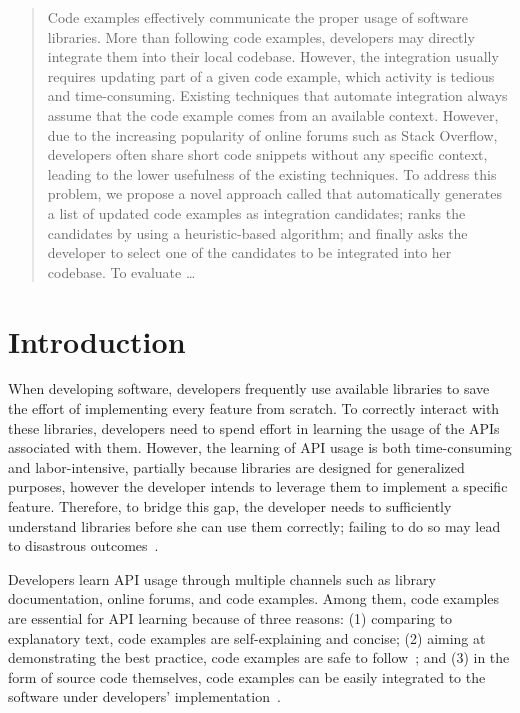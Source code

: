 
\begin{abstract}
Code examples effectively communicate the proper usage of software libraries.
More than following code examples, developers may directly integrate them into
their local codebase. However, the integration usually requires updating part of
a given code example, which activity is tedious and time-consuming.
Existing techniques that automate integration always assume that the code
example comes from an available context. However, due to the increasing
popularity of online forums such as Stack Overflow, developers often share short
code snippets without any specific context, leading to the lower usefulness of
the existing techniques. To address this problem, we propose a novel approach
called \toolname{} that automatically generates a list of updated code examples
as integration candidates; ranks the candidates by using a heuristic-based
algorithm; and finally asks the developer to select one of the candidates to be
integrated into her codebase. To evaluate \toolname{}\ldots
\end{abstract}

\section{Introduction}
When developing software, developers frequently use available libraries to save
the effort of implementing every feature from scratch. To correctly interact
with these libraries, developers need to spend effort in learning the usage of
the APIs associated with them. However, the learning of API usage is both
time-consuming and labor-intensive, partially because libraries are designed for
generalized purposes, however the developer intends to leverage them to
implement a specific feature. Therefore, to bridge this gap, the
developer needs to sufficiently understand libraries before she can use them
correctly; failing to do so may lead to disastrous outcomes~\cite{Egele}.

Developers learn API usage through multiple channels such as library
documentation, online forums, and code examples. Among them, code examples are
essential for API learning because of three reasons: (1) comparing to
explanatory text, code examples are self-explaining and concise; (2) aiming at
demonstrating the best practice, code examples are safe to
follow~\cite{Robillard}; and (3) in the form of source code themselves, code
examples can be easily integrated to the software under developers'
implementation~\cite{Rosson}.

